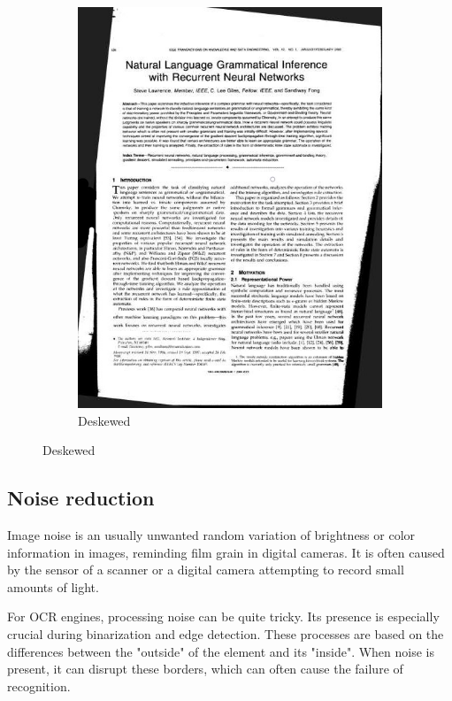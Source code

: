 \begin{figure}[H]
\begin{subfigure}{0.31\textwidth}
\includegraphics[width=\linewidth]{img/deskew_new.jpg}
\caption{Deskewed} \label{fig:1b}
\end{subfigure}
\end{figure}

\subsection{Noise reduction}

Image noise is an usually unwanted random variation of brightness or color information in images, reminding film grain in digital cameras. It is often caused by the sensor of a scanner or a digital camera attempting to record small amounts of light. 

For OCR engines, processing noise can be quite tricky. Its presence is especially crucial during binarization and edge detection. These processes are based on the differences between the "outside" of the element and its "inside". When noise is present, it can disrupt these borders, which can often cause the failure of recognition.

